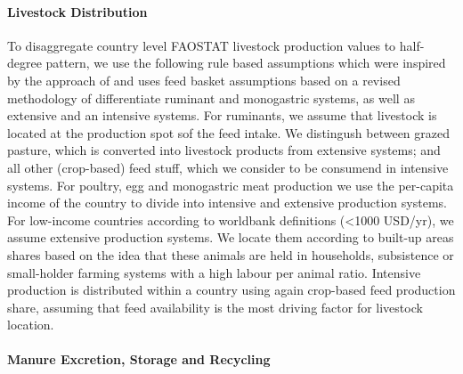 \documentclass[gc, manuscript]{copernicus}
\begin{document}
\paragraph{Livestock Distribution}

To disaggregate country level FAOSTAT livestock production values to
half-degree pattern, we use the following rule based assumptions which
were inspired by the approach of \citep{gilbert} and uses feed basket
assumptions based on a revised methodology of \citet{weindl.We}
differentiate ruminant and monogastric systems, as well as extensive and
an intensive systems. For ruminants, we assume that livestock is located
at the production spot sof the feed intake. We distingush between grazed
pasture, which is converted into livestock products from extensive
systems; and all other (crop-based) feed stuff, which we consider to be
consumend in intensive systems. For poultry, egg and monogastric meat
production we use the per-capita income of the country to divide into
intensive and extensive production systems. For low-income countries
according to worldbank definitions (\textless1000 USD/yr), we assume
extensive production systems. We locate them according to built-up areas
shares based on the idea that these animals are held in households,
subsistence or small-holder farming systems with a high labour per
animal ratio. Intensive production is distributed within a country using
again crop-based feed production share, assuming that feed availability
is the most driving factor for livestock location.

\paragraph{Manure Excretion, Storage and Recycling}
\end{document}
